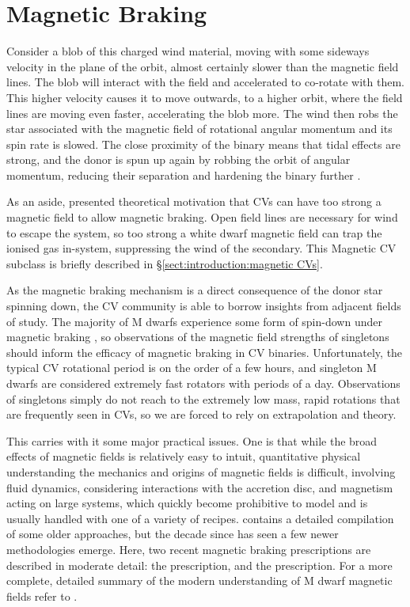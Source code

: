 \section{Magnetic Braking}
\label{sect:introduction:magnetic braking}

Consider a blob of this charged wind material, moving with some sideways velocity in the plane of the orbit, almost certainly slower than the magnetic field lines. 
The blob will interact with the field and accelerated to co-rotate with them.
This higher velocity causes it to move outwards, to a higher orbit, where the field lines are moving even faster, accelerating the blob more. 
The wind then robs the star associated with the magnetic field of rotational angular momentum and its spin rate is slowed. The close proximity of the binary means that tidal effects are strong, and the donor is spun up again by robbing the orbit of angular momentum, reducing their separation and hardening the binary further \citep{verbunt1981}.

As an aside, \citet{wickramasinghe1996} presented theoretical motivation that CVs can have too strong a magnetic field to allow magnetic braking. Open field lines are necessary for wind to escape the system, so too strong a white dwarf magnetic field can trap the ionised gas in-system, suppressing the wind of the secondary. This Magnetic CV subclass is briefly described in \S\ref{sect:introduction:magnetic CVs}.

As the magnetic braking mechanism is a direct consequence of the donor star spinning down, the CV community is able to borrow insights from adjacent fields of study. The majority of M dwarfs experience some form of spin-down under magnetic braking , so observations of the magnetic field strengths of singletons should inform the efficacy of magnetic braking in CV binaries. Unfortunately, the typical CV rotational period is on the order of a few hours, and singleton M dwarfs are considered extremely fast rotators with periods of a day. Observations of singletons simply do not reach to the extremely low mass, rapid rotations that are frequently seen in CVs, so we are forced to rely on extrapolation and theory.

This carries with it some major practical issues. One is that while the broad effects of magnetic fields is relatively easy to intuit, quantitative physical understanding the mechanics and origins of magnetic fields is difficult, involving fluid dynamics, considering interactions with the accretion disc, and magnetism acting on large systems, which quickly become prohibitive to model and is usually handled with one of a variety of recipes. \citealt{knigge11} contains a detailed compilation of some older approaches, but the decade since has seen a few newer methodologies emerge. Here, two recent magnetic braking prescriptions are described in moderate detail: the \citet{matt2015} prescription, and the \citet{garraffo2018a} prescription. For a more complete, detailed summary of the modern understanding of M dwarf magnetic fields refer to \citet{kochukhov2021}. 



